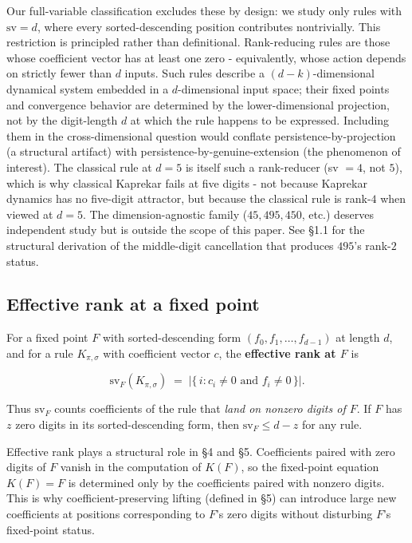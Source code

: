 \documentclass[11pt,letterpaper]{article}
\theoremstyle{paperstyle}
\theoremstyle{paperstyledef}
\theoremstyle{paperstylerem}
\begin{document}
Our full-variable classification excludes these by design: we study only
rules with \(\mathrm{sv} = d\), where every sorted-descending position
contributes nontrivially. This restriction is principled rather than
definitional. Rank-reducing rules are those whose coefficient vector has
at least one zero - equivalently, whose action depends on strictly
fewer than \(d\) inputs. Such rules describe a \((d-k)\)-dimensional
dynamical system embedded in a \(d\)-dimensional input space; their
fixed points and convergence behavior are determined by the
lower-dimensional projection, not by the digit-length \(d\) at which the
rule happens to be expressed. Including them in the cross-dimensional
question would conflate persistence-by-projection (a structural
artifact) with persistence-by-genuine-extension (the phenomenon of
interest). The classical rule at \(d = 5\) is itself such a rank-reducer
(sv \(= 4\), not \(5\)), which is why classical Kaprekar fails at five
digits - not because Kaprekar dynamics has no five-digit attractor,
but because the classical rule is rank-\(4\) when viewed at \(d = 5\).
The dimension-agnostic family (\(45, 495, 450\), etc.) deserves
independent study but is outside the scope of this paper. See §1.1 for
the structural derivation of the middle-digit cancellation that produces
\(495\)'s rank-\(2\) status.

\hypertarget{effective-rank-at-a-fixed-point}{%
\subsection{Effective rank at a fixed point}\label{effective-rank-at-a-fixed-point}}

For a fixed point \(F\) with sorted-descending form
\((f_0, f_1, \ldots, f_{d-1})\) at length \(d\), and for a rule
\(K_{\pi, \sigma}\) with coefficient vector \(c\), the \textbf{effective
rank at \(F\)} is

\[\mathrm{sv}_F(K_{\pi, \sigma}) \;=\; \bigl|\{\,i : c_i \neq 0 \text{ and } f_i \neq 0\,\}\bigr|.\]

Thus \(\mathrm{sv}_F\) counts coefficients of the rule that \emph{land
on nonzero digits of \(F\)}. If \(F\) has \(z\) zero digits in its
sorted-descending form, then \(\mathrm{sv}_F \leq d - z\) for any rule.

Effective rank plays a structural role in §4 and §5. Coefficients paired
with zero digits of \(F\) vanish in the computation of \(K(F)\), so the
fixed-point equation \(K(F) = F\) is determined only by the coefficients
paired with nonzero digits. This is why coefficient-preserving lifting
(defined in §5) can introduce large new coefficients at positions
corresponding to \(F\)'s zero digits without disturbing \(F\)'s
fixed-point status.
\end{document}
